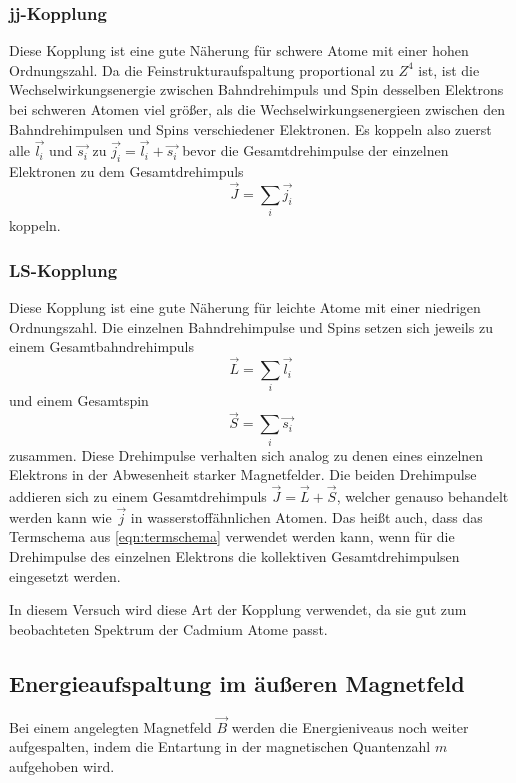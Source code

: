         \subsubsection*{jj-Kopplung}
            Diese Kopplung ist eine gute Näherung für schwere Atome mit einer hohen Ordnungszahl.
            Da die Feinstrukturaufspaltung proportional zu $Z^4$ ist, ist die Wechselwirkungsenergie zwischen Bahndrehimpuls und Spin desselben Elektrons bei schweren Atomen viel größer, als die Wechselwirkungsenergieen zwischen den Bahndrehimpulsen und Spins verschiedener Elektronen.
            Es koppeln also zuerst alle $\vec{l_i}$ und $\vec{s_i}$ zu $\vec{j_i} = \vec{l_i} + \vec{s_i}$ bevor die Gesamtdrehimpulse der einzelnen Elektronen zu dem Gesamtdrehimpuls
            \begin{equation}
                \vec{J} = \sum_i \vec{j_i}
            \end{equation}
            koppeln.

        \subsubsection*{LS-Kopplung}
            Diese Kopplung ist eine gute Näherung für leichte Atome mit einer niedrigen Ordnungszahl.
            Die einzelnen Bahndrehimpulse und Spins setzen sich jeweils zu einem Gesamtbahndrehimpuls
            \begin{equation}
                \vec{L} = \sum_i \vec{l_i}
            \end{equation}
            und einem Gesamtspin
            \begin{equation}
                \vec{S} = \sum_i \vec{s_i}
            \end{equation}
            zusammen.
            Diese Drehimpulse verhalten sich analog zu denen eines einzelnen Elektrons in der Abwesenheit starker Magnetfelder.
            Die beiden Drehimpulse addieren sich zu einem Gesamtdrehimpuls $\vec{J} = \vec{L} + \vec{S}$, welcher genauso behandelt werden kann wie $\vec{j}$ in wasserstoffähnlichen Atomen.
            Das heißt auch, dass das Termschema aus \autoref{eqn:termschema} verwendet werden kann, wenn für die Drehimpulse des einzelnen Elektrons die kollektiven Gesamtdrehimpulsen eingesetzt werden.

            In diesem Versuch wird diese Art der Kopplung verwendet, da sie gut zum beobachteten Spektrum der Cadmium Atome passt.

    \subsection{Energieaufspaltung im äußeren Magnetfeld}
        Bei einem angelegten Magnetfeld $\vec{B}$ werden die Energieniveaus noch weiter aufgespalten, indem die Entartung in der magnetischen Quantenzahl $m$ aufgehoben wird.
